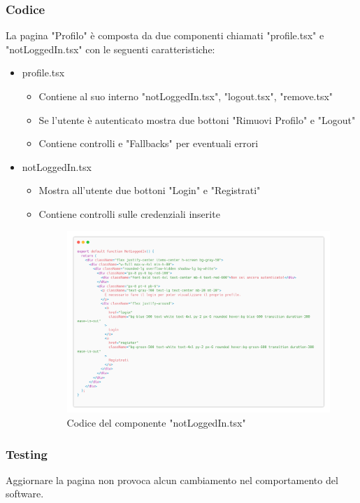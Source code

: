 \documentclass{report}
\begin{document}
\subsubsection*{Codice}
La pagina "Profilo" è composta da due componenti chiamati "profile.tsx" e "notLoggedIn.tsx" con le seguenti caratteristiche:
\begin{itemize}
	\item profile.tsx
	\begin{itemize}
		\item Contiene al suo interno "notLoggedIn.tsx", "logout.tsx", "remove.tsx"
		\item Se l'utente è autenticato mostra due bottoni "Rimuovi Profilo" e "Logout"
		\item Contiene controlli e "Fallbacks" per eventuali errori
	\end{itemize}
	\item notLoggedIn.tsx
	\begin{itemize}
		\item Mostra all'utente due bottoni "Login" e "Registrati"
		\item Contiene controlli sulle credenziali inserite
		\begin{figure}[H]
			\centering\includegraphics[width=1\textwidth]{images/microservizio-autenticazione/frontend/notLoggedIn-carbon.png}
			Codice del componente "notLoggedIn.tsx"
		\end{figure}
	\end{itemize}
\end{itemize}

\subsubsection*{Testing}
Aggiornare la pagina non provoca alcun cambiamento nel comportamento del software.\\
\end{document}
